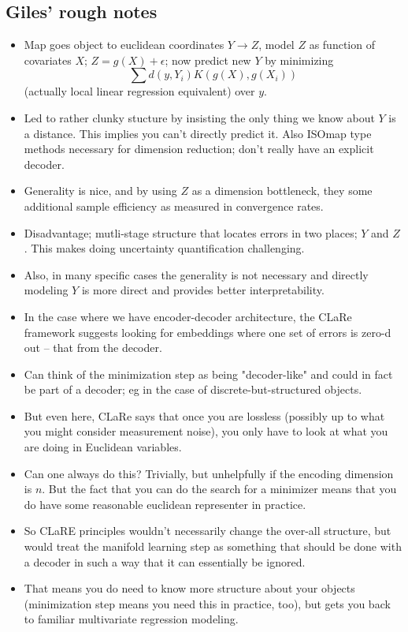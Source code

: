 \subsection*{Giles' rough notes}

\begin{itemize}
    \item Map goes object to euclidean coordinates $Y \rightarrow Z$,  model $Z$ as function of covariates $X$; $Z = g(X) + \epsilon$; now predict new $Y$ by minimizing
    \[
        \sum d(y,Y_i) K(g(X), g(X_i))
    \]
    (actually local linear regression equivalent) over $y$. 

    \item Led to rather clunky stucture by insisting the only thing we know about $Y$ is a distance. This implies you can't directly predict it.   Also ISOmap type methods necessary for dimension reduction; don't really have an explicit decoder. 

    \item Generality is nice, and by using $Z$ as a dimension bottleneck, they some additional sample efficiency as measured in convergence rates. 

    \item Disadvantage; mutli-stage structure that locates errors in two places; $Y$ and $Z$. This makes doing uncertainty quantification challenging. 

    \item Also, in many specific cases the generality is not necessary and directly modeling $Y$ is more direct and provides better interpretability. 

    \item In the case where we have encoder-decoder architecture, the CLaRe framework suggests looking for embeddings where one set of errors is zero-d out -- that from the decoder. 

    \item Can think of the minimization step as being "decoder-like" and could in fact be part of a decoder; eg in the case of discrete-but-structured objects. 

    \item But even here, CLaRe says that once you are lossless (possibly up to what you might consider measurement noise), you only have to look at what you are doing in Euclidean variables. 

    \item Can one always do this? Trivially, but unhelpfully if the encoding dimension is $n$. But the fact that you can do the search for a minimizer means that you do have some reasonable euclidean representer in practice. 

    \item So CLaRE principles wouldn't necessarily change the over-all structure, but would treat the manifold learning step as something that should be done with a decoder in such a way that it can essentially be ignored. 

    \item That means you do need to know more structure about your objects (minimization step means you need this in practice, too), but gets you back to familiar multivariate regression modeling. 
\end{itemize}